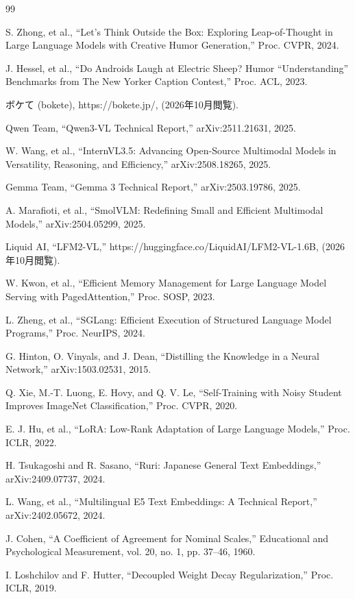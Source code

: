 \begin{thebibliography}{99}

    S. Zhong, et al., ``Let's Think Outside the Box: Exploring Leap-of-Thought in Large Language Models with Creative Humor Generation,'' Proc. CVPR, 2024.

    J. Hessel, et al., ``Do Androids Laugh at Electric Sheep? Humor ``Understanding'' Benchmarks from The New Yorker Caption Contest,'' Proc. ACL, 2023.

    ボケて (bokete), https://bokete.jp/, (2026年10月閲覧).

    Qwen Team, ``Qwen3-VL Technical Report,'' arXiv:2511.21631, 2025.

    W. Wang, et al., ``InternVL3.5: Advancing Open-Source Multimodal Models in Versatility, Reasoning, and Efficiency,'' arXiv:2508.18265, 2025.

    Gemma Team, ``Gemma 3 Technical Report,'' arXiv:2503.19786, 2025.

    A. Marafioti, et al., ``SmolVLM: Redefining Small and Efficient Multimodal Models,'' arXiv:2504.05299, 2025.

    Liquid AI, ``LFM2-VL,'' https://huggingface.co/LiquidAI/LFM2-VL-1.6B, (2026年10月閲覧).

    W. Kwon, et al., ``Efficient Memory Management for Large Language Model Serving with PagedAttention,'' Proc. SOSP, 2023.

    L. Zheng, et al., ``SGLang: Efficient Execution of Structured Language Model Programs,'' Proc. NeurIPS, 2024.

    G. Hinton, O. Vinyals, and J. Dean, ``Distilling the Knowledge in a Neural Network,'' arXiv:1503.02531, 2015.

    Q. Xie, M.-T. Luong, E. Hovy, and Q. V. Le, ``Self-Training with Noisy Student Improves ImageNet Classification,'' Proc. CVPR, 2020.

    E. J. Hu, et al., ``LoRA: Low-Rank Adaptation of Large Language Models,'' Proc. ICLR, 2022.

    H. Tsukagoshi and R. Sasano, ``Ruri: Japanese General Text Embeddings,'' arXiv:2409.07737, 2024.

    L. Wang, et al., ``Multilingual E5 Text Embeddings: A Technical Report,'' arXiv:2402.05672, 2024.

    J. Cohen, ``A Coefficient of Agreement for Nominal Scales,'' Educational and Psychological Measurement, vol. 20, no. 1, pp. 37--46, 1960.

    I. Loshchilov and F. Hutter, ``Decoupled Weight Decay Regularization,'' Proc. ICLR, 2019.

\end{thebibliography}
